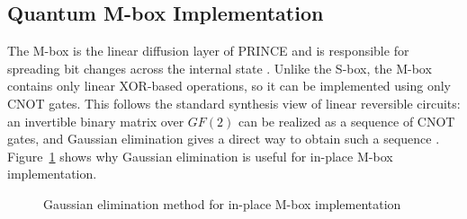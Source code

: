 \documentclass[11pt,a4paper]{article}
\begin{document}
\subsection{Quantum M-box Implementation}

The M-box is the linear diffusion layer of PRINCE and is responsible for spreading bit changes across the internal state \cite{borghoff2012prince}. Unlike the S-box, the M-box contains only linear XOR-based operations, so it can be implemented using only CNOT gates. This follows the standard synthesis view of linear reversible circuits: an invertible binary matrix over $GF(2)$ can be realized as a sequence of CNOT gates, and Gaussian elimination gives a direct way to obtain such a sequence \cite{patel2008optimal}. Figure~\ref{fig:gaussian_mbox} shows why Gaussian elimination is useful for in-place M-box implementation.

\begin{figure}[h]
\centering
{}
\caption{Gaussian elimination method for in-place M-box implementation \cite{patel2008optimal}}
\label{fig:gaussian_mbox}
\end{figure}
\end{document}
